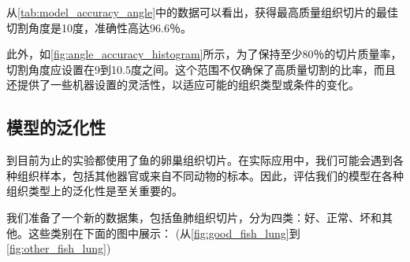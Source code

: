 从\autoref{tab:model_accuracy_angle}中的数据可以看出，获得最高质量组织切片的最佳切割角度是10度，准确性高达96.6％。

此外，如\autoref{fig:angle_accuracy_histogram}所示，为了保持至少80％的切片质量率，切割角度应设置在9到10.5度之间。这个范围不仅确保了高质量切割的比率，而且还提供了一些机器设置的灵活性，以适应可能的组织类型或条件的变化。

\subsection{模型的泛化性}

到目前为止的实验都使用了鱼的卵巢组织切片。在实际应用中，我们可能会遇到各种组织样本，包括其他器官或来自不同动物的标本。因此，评估我们的模型在各种组织类型上的泛化性是至关重要的。

我们准备了一个新的数据集，包括鱼肺组织切片，分为四类：好、正常、坏和其他。这些类别在下面的图中展示： (从\autoref{fig:good_fish_lung}到\autoref{fig:other_fish_lung})

